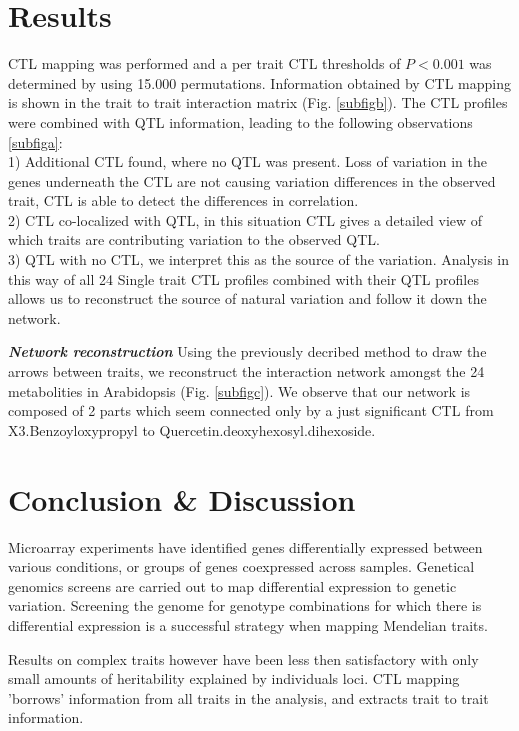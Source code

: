 \documentclass{bioinfo}
\begin{document}
\section{Results}
  CTL mapping was performed and a per trait CTL thresholds of $P < 0.001$ was determined by using 15.000 permutations.
  Information obtained by CTL mapping is shown in the trait to trait interaction matrix (Fig. \ref{subfigb}).
  The CTL profiles were combined with QTL information, leading to the following observations \ref{subfiga}:\\
  1) Additional CTL found, where no QTL was present. Loss of variation in the genes 
  underneath the CTL are not causing variation differences in the observed trait, CTL is able to 
  detect the differences in correlation.\\
  2) CTL co-localized with QTL, in this situation CTL gives a detailed view of which traits 
  are contributing variation to the observed QTL.\\
  3) QTL with no CTL, we interpret this as the source of the variation. Analysis in this way of 
  all 24 Single trait CTL profiles combined with their QTL profiles allows us to reconstruct the 
  source of natural variation and follow it down the network.

\emph{ {\bf Network reconstruction}}
  Using the previously decribed method to draw the arrows between traits, we reconstruct the interaction 
  network amongst the 24 metabolities in Arabidopsis (Fig. \ref{subfigc}). We observe that our network is 
  composed of 2 parts which seem connected only by a just significant CTL from X3.Benzoyloxypropyl to 
  Quercetin.deoxyhexosyl.dihexoside.

\section{Conclusion \& Discussion}
  Microarray experiments have identified genes differentially expressed between various 
  conditions, or groups of genes coexpressed across samples. Genetical genomics screens 
  are carried out to map differential expression to genetic variation. Screening 
  the genome for genotype combinations for which there is differential expression is 
  a successful strategy when mapping Mendelian traits. 
  
  Results on complex traits however have been less then satisfactory with only small 
  amounts of heritability explained by individuals loci. CTL mapping 'borrows'
  information from all traits in the analysis, and extracts trait to trait 
   information.
 
\end{document}
